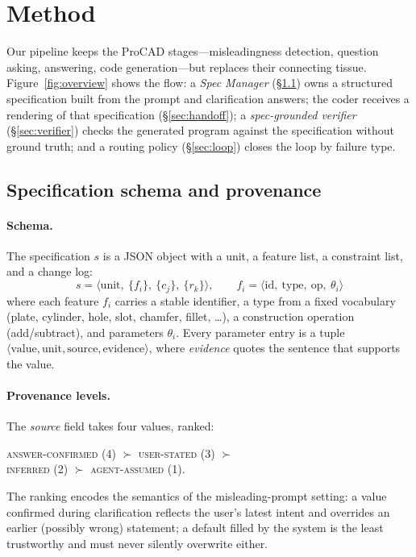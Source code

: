 \section{Method}\label{sec:method}

Our pipeline keeps the ProCAD stages---misleadingness detection, question
asking, answering, code generation---but replaces their connecting tissue.
Figure~\ref{fig:overview} shows the flow: a \emph{Spec Manager}
(\S\ref{sec:spec}) owns a structured specification built from the prompt and
clarification answers; the coder receives a rendering of that specification
(\S\ref{sec:handoff}); a \emph{spec-grounded verifier} (\S\ref{sec:verifier})
checks the generated program against the specification without ground truth;
and a routing policy (\S\ref{sec:loop}) closes the loop by failure type.

\subsection{Specification schema and provenance}\label{sec:spec}

\paragraph{Schema.}
The specification $s$ is a JSON object with a unit, a feature list, a
constraint list, and a change log:
\begin{equation*}
s = \langle \mathrm{unit},\ \{f_i\},\ \{c_j\},\ \{r_k\}\rangle,\qquad
f_i = \langle \mathrm{id},\ \mathrm{type},\ \mathrm{op},\ \theta_i\rangle
\end{equation*}
where each feature $f_i$ carries a stable identifier, a type from a fixed
vocabulary (plate, cylinder, hole, slot, chamfer, fillet, \dots), a
construction operation (add/subtract), and parameters $\theta_i$. Every
parameter entry is a tuple
$\langle \text{value},\text{unit},\text{source},\text{evidence}\rangle$,
where \textit{evidence} quotes the sentence that supports the value.

\paragraph{Provenance levels.}
The \textit{source} field takes four values, ranked:
\begin{center}
\small
\textsc{answer-confirmed} (4) $\succ$ \textsc{user-stated} (3) $\succ$\\
\textsc{inferred} (2) $\succ$ \textsc{agent-assumed} (1).
\end{center}
The ranking encodes the semantics of the misleading-prompt setting: a value
confirmed during clarification reflects the user's latest intent and
overrides an earlier (possibly wrong) statement; a default filled by the
system is the least trustworthy and must never silently overwrite either.

